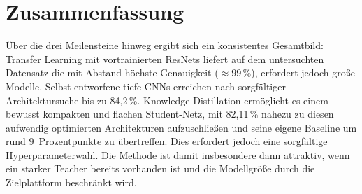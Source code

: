 \section{Zusammenfassung}
\label{sec:fazit}

Über die drei Meilensteine hinweg ergibt sich ein konsistentes Gesamtbild: Transfer Learning mit vortrainierten
ResNets liefert auf dem untersuchten Datensatz die mit Abstand höchste Genauigkeit ($\approx 99\,\%$), erfordert
jedoch große Modelle. Selbst entworfene tiefe CNNs erreichen nach sorgfältiger Architektursuche bis zu 84{,}2\,\%.
Knowledge Distillation ermöglicht es einem bewusst kompakten und flachen Student-Netz, mit 82{,}11\,\% nahezu zu
diesen aufwendig optimierten Architekturen aufzuschließen und seine eigene Baseline um rund 9~Prozentpunkte zu
übertreffen. Dies erfordert jedoch eine sorgfältige Hyperparameterwahl. Die Methode ist damit insbesondere dann
attraktiv, wenn ein starker Teacher bereits vorhanden ist und die Modellgröße durch die Zielplattform beschränkt wird.
